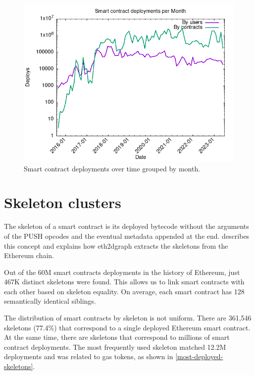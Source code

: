 \begin{figure}[!ht]
    \centering
    \includegraphics[width=1\textwidth]{Figures/analysis/deploys_per_month.png}
    \caption{Smart contract deployments over time grouped by month.}
    \label{fig:deploy-history}
\end{figure}

\newpage

\section{Skeleton clusters}

The skeleton of a smart contract is its deployed bytecode without the arguments of the PUSH opcodes and the eventual metadata appended at the end.  describes this concept and explains how eth2dgraph extracts the skeletons from the Ethereum chain.

Out of the 60M smart contracts deployments in the history of Ethereum, just 467K distinct skeletons were found. This allows us to link smart contracts with each other based on skeleton equality. On average, each smart contract has 128 semantically identical siblings. 

The distribution of smart contracts by skeleton is not uniform. There are 361,546 skeletons (77.4\%) that correspond to a single deployed Ethereum smart contract. At the same time, there are skeletons that correspond to millions of smart contract deployments. The most frequently used skeleton matched 12.2M deployments and was related to gas tokens, as shown in \cref{most-deployed-skeletons}.

